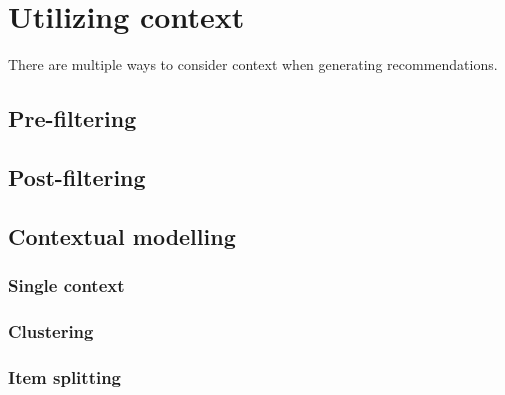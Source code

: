 \section{Utilizing context}
There are multiple ways to consider context when generating recommendations.

\subsection{Pre-filtering}

\subsection{Post-filtering}

\subsection{Contextual modelling}

\subsubsection{Single context}

\subsubsection{Clustering}

\subsubsection{Item splitting}

